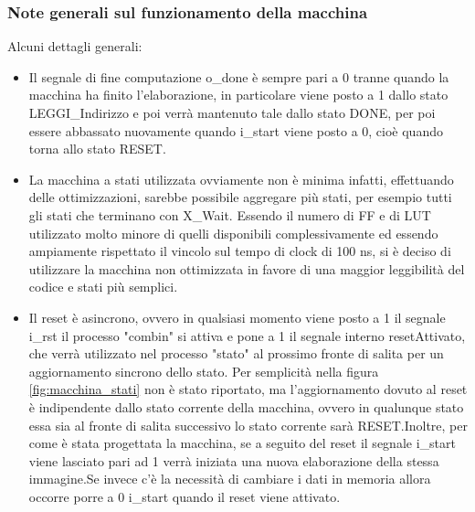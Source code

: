 \subsubsection{Note generali sul funzionamento della macchina}
Alcuni dettagli generali:\\
\begin{itemize}
    \item Il segnale di fine computazione o\_done è sempre pari a 0 tranne quando la macchina ha finito l'elaborazione, in particolare viene posto a 1 dallo stato LEGGI\_Indirizzo e poi verrà mantenuto tale dallo stato DONE, per poi essere abbassato nuovamente quando i\_start viene posto a 0, cioè quando torna allo stato RESET.
    
    \item La macchina a stati utilizzata ovviamente non è minima infatti, effettuando delle ottimizzazioni, sarebbe possibile aggregare più stati, per esempio tutti gli stati che terminano con X\_Wait. 
    Essendo il numero di FF e di LUT utilizzato molto minore di quelli disponibili complessivamente ed essendo ampiamente rispettato il vincolo sul tempo di clock di 100 ns, si è deciso di utilizzare la macchina non ottimizzata in favore di una maggior leggibilità del codice e stati più semplici.
    
    \item Il reset è asincrono, ovvero in qualsiasi momento viene posto a 1 il segnale i\_rst il processo "combin" si attiva e pone a 1 il segnale interno resetAttivato, che verrà utilizzato nel processo "stato" al prossimo fronte di salita per un aggiornamento sincrono dello stato. Per semplicità nella figura \ref{fig:macchina_stati} non è stato riportato, ma l'aggiornamento dovuto al reset è indipendente dallo stato corrente della macchina, ovvero in qualunque stato essa sia al fronte di salita successivo lo stato corrente sarà RESET.Inoltre, per come è stata progettata la macchina, se a seguito del reset il segnale i\_start viene lasciato pari ad 1 verrà iniziata una nuova elaborazione della stessa immagine.Se invece c'è la necessità di cambiare i dati in memoria allora occorre porre a 0 i\_start quando il reset viene attivato.

\end{itemize}



























